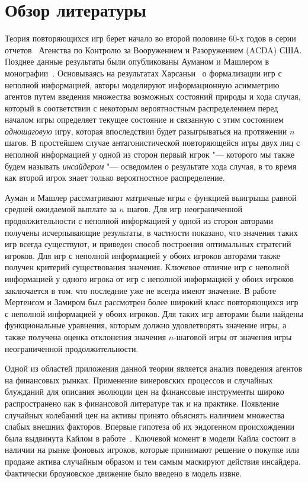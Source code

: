 \chapter*{Обзор литературы}

Теория повторяющихся игр берет начало во второй половине 60-х годов в серии отчетов~\cite{r:aumann66, r:aumann67, r:aumann68a, r:aumann68b, r:stearns67} Агенства по Контролю за Вооружением и Разоружением (ACDA) США.
Позднее данные результаты были опубликованы Ауманом и Машлером в монографии~\cite{aumann95}.
Основываясь на результатах Харсаньи~\cite{harsanyi67} о формализации игр с неполной информацией, авторы моделируют информационную асимметрию агентов путем введения множества возможных состояний природы и хода случая, который в соответствии с некоторым вероятностным распределением перед началом игры определяет текущее состояние и связанную с этим состоянием \emph{одношаговую} игру, которая впоследствии будет разыгрываться на протяжении $n$ шагов.
В простейшем случае антагонистической повторяющейся игры двух лиц с неполной информацией у одной из сторон первый игрок "--- которого мы также будем называть \emph{инсайдером} "--- осведомлен о результате хода случая, в то время как второй игрок знает только вероятностное распределение.

Ауман и Машлер рассматривают матричные игры c функцией выигрыша равной средней ожидаемой выплате за $n$ шагов.
Для игр неограниченной продолжительности с неполной информацией у одной из сторон авторами получены исчерпывающие результаты, в частности показано, что значения таких игр всегда существуют, и приведен способ построения оптимальных стратегий игроков.
Для игр с неполной информацией у обоих игроков авторами также получен критерий существования значения.
Ключевое отличие игр с неполной информацией у одного игрока от игр с неполной информацией у обоих игроков заключается в том, что последние уже не всегда имеют значение.
В работе~\cite{mertens71} Мертенсом и Замиром был рассмотрен более широкий класс повторяющихся игр с неполной информацией у обоих игроков.
Для таких игр авторами были найдены функциональные уравнения, которым должно удовлетворять значение игры, а также получена оценка отклонения значения $n$-шаговой игры от значения игры неограниченной продолжительности.

Одной из областей приложения данной теории является анализ поведения агентов на финансовых рынках.
Применение винеровских процессов и случайных блужданий для описания эволюции цен на финансовые инструменты широко распространено как в
финансовой литературе так и на практике.
Появление случайных колебаний цен на активы принято объяснять наличием множества слабых внешних факторов.
Впервые гипотеза об их эндогенном происхождении была выдвинута Кайлом в работе~\cite{kyle85}.
Ключевой момент в модели Кайла состоит в наличии на рынке фоновых игроков, которые принимают решение о покупке или продаже актива случайным образом и тем самым маскируют действия инсайдера.
Фактически броуновское движение было введено в модель извне.

